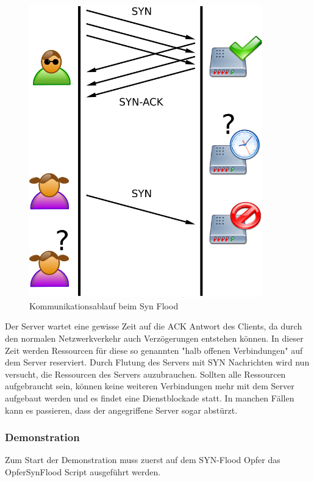 	\begin{figure}[H]
		\centering
		\includegraphics[width=0.9\textwidth]{images/dos/syn_flood_theorie.png}
		\caption{Kommunikationsablauf beim Syn Flood}
		\label{fig:syn flood theorie}
	\end{figure}
Der Server wartet eine gewisse Zeit auf die ACK Antwort des Clients, da durch den normalen Netzwerkverkehr auch Verzögerungen entstehen können. In dieser Zeit werden Ressourcen für diese so genannten "halb offenen Verbindungen" auf dem Server reserviert. Durch Flutung des Servers mit SYN Nachrichten wird nun versucht, die Ressourcen des Servers auzubrauchen. Sollten alle Ressourcen aufgebraucht sein, können keine weiteren Verbindungen mehr mit dem Server aufgebaut werden und es findet eine Dienstblockade statt.
In manchen Fällen kann es passieren, dass der angegriffene Server sogar abstürzt.

\subsubsection{Demonstration}

Zum Start der Demonstration muss zuerst auf dem SYN-Flood Opfer das OpferSynFlood Script ausgeführt werden.  

